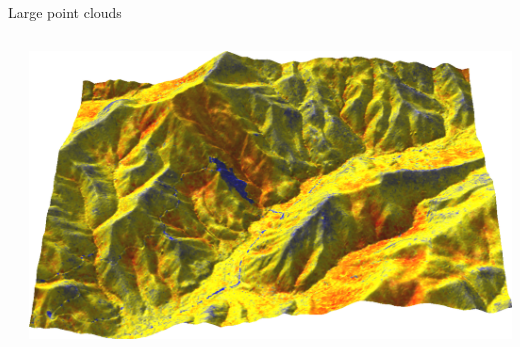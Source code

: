 \documentclass[xcolor={dvipsnames,usenames},beamer,aspectratio=169]{beamer}
\newcommand{\gmodule}[1]{\href{http://grass.osgeo.org/grass71/manuals/#1.html}{\emph{#1}}}
\begin{document}
\begin{frame}{Large point clouds}
\begin{columns}
\begin{column}{0.44\textwidth}
\end{column}
\begin{column}{0.44\textwidth}

\includegraphics[width=\textwidth]{grass/range_on_ground_from_north}

\end{column}
\end{columns}

\end{frame}
\end{document}
